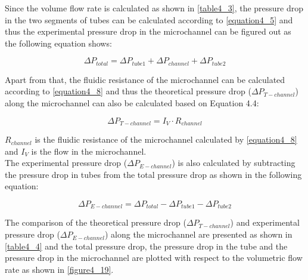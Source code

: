 Since the volume flow rate is calculated as shown in \autoref{table4_3}, the pressure drop in the two segments of tubes can be calculated according to \autoref{equation4_5} and thus the experimental pressure drop in the microchannel can be figured out as the following equation shows:

\begin{equation}
    \Delta P_{total} = \Delta P_{tube1} + \Delta P_{channel} + \Delta P_{tube2}
    \label{equation4_10}
\end{equation}

Apart from that, the fluidic resistance of the microchannel can be calculated according to \autoref{equation4_8} and thus the theoretical pressure drop ($\Delta P_{T-channel}$) along the microchannel can also be calculated based on Equation 4.4:

\begin{equation}
    \Delta P_{T-channel} = I_V \cdot R_{channel}
    \label{equation4_11}
\end{equation}

$R_{channel}$ is the fluidic resistance of the microchannel calculated by \autoref{equation4_8} and $I_V$ is the flow in the microchannel.\\

The experimental pressure drop ($\Delta P_{E-channel}$) is also calculated by subtracting the pressure drop in tubes from the total pressure drop as shown in the following equation: 

\begin{equation}
    \Delta P_{E-channel} = \Delta P_{total} - \Delta P_{tube1} - \Delta P_{tube2}
    \label{equation4_12}
\end{equation}

The comparison of the theoretical pressure drop ($\Delta P_{T-channel}$) and experimental pressure drop ($\Delta P_{E-channel}$) along the microchannel are presented as shown in \autoref{table4_4} and the total pressure drop, the pressure drop in the tube and the pressure drop in the microchannel are plotted with respect to the volumetric flow rate as shown in \autoref{figure4_19}. \\

